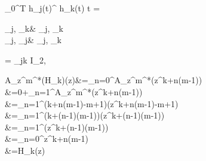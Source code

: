 


\taskone
    
\begin{code}
    \begin{imaths}
         \int_0^T
      h_j(t)^ h_k(t)
       t
      =
      {\begin{bmatrix}
        \langle \varphi_j, \varphi_k\rangle & \langle \varphi_j, \psi_k\rangle\\
        \langle \psi_j, \varphi_j\rangle & \langle \psi_j, \psi_k\rangle
      \end{bmatrix}}
      =
      \delta_{jk}
      I_2,
    \end{imaths}
\end{code}

\newpage






\tasktwo

\begin{code}
    \begin{imaths}
       A_{z^m}^*(H_k)(z)&=\sum_{n=0}^\infty {}A_{z^m}^*\left(z^{k+n(m-1)}\right)\\
       &=0+\sum_{n=1}^\infty {}A_{z^m}^*\left(z^{k+n(m-1)}\right)\\
       &=\sum_{n=1}^\infty {}\cdot(k+n(m-1)-m+1)\cdot\left(z^{k+n(m-1)-m+1}\right)\\
       &=\sum_{n=1}^\infty {}\cdot(k+(n-1)(m-1))\cdot\left(z^{k+(n-1)(m-1)}\right)\\
        &=\sum_{n=1}^\infty {}\left(z^{k+(n-1)(m-1)}\right)\\
        &=\lambda\cdot \sum_{n=0}^\infty {}z^{k+n(m-1)}\\
        &=\lambda H_k(z)
    \end{imaths}
\end{code}

